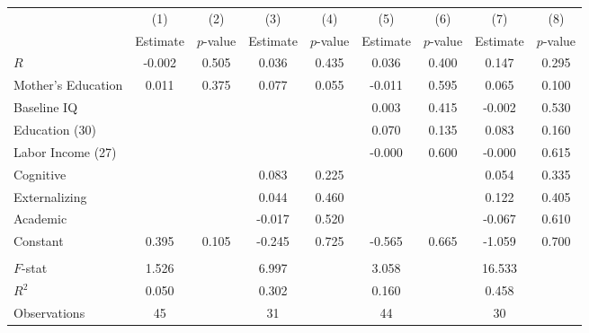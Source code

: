 \begin{tabular}{lcccccccc} \toprule
 & (1) & (2) & (3) & (4) & (5) & (6) & (7) & (8) \\ 
 & Estimate  & $p$-value  & Estimate  & $p$-value  & Estimate  & $p$-value  & Estimate  & $p$-value  \\  \midrule
$R$ &    -0.002 &     0.505 &     0.036 &     0.435 &     0.036 &     0.400 &     0.147 &     0.295 \\  
Mother's Education &     0.011 &     0.375 &     0.077 &     0.055 &    -0.011 &     0.595 &     0.065 &     0.100 \\  
Baseline IQ &         &         &         &         &     0.003 &     0.415 &    -0.002 &     0.530 \\  
Education (30) &         &         &         &         &     0.070 &     0.135 &     0.083 &     0.160 \\  
Labor Income (27) &         &         &         &         &    -0.000 &     0.600 &    -0.000 &     0.615 \\  
Cognitive &         &         &     0.083 &     0.225 &         &         &     0.054 &     0.335 \\  
Externalizing &         &         &     0.044 &     0.460 &         &         &     0.122 &     0.405 \\  
Academic &         &         &    -0.017 &     0.520 &         &         &    -0.067 &     0.610 \\  
Constant &     0.395 &     0.105 &    -0.245 &     0.725 &    -0.565 &     0.665 &    -1.059 &     0.700 \\ \\ \midrule
$F$-stat &     1.526 &         &     6.997 &         &     3.058 &         &    16.533 &         \\  
$R^2$ &     0.050 &         &     0.302 &         &     0.160 &         &     0.458 &         \\  
Observations &    45 &         &    31 &         &    44 &         &    30 &         \\  
\bottomrule 
\end{tabular}


